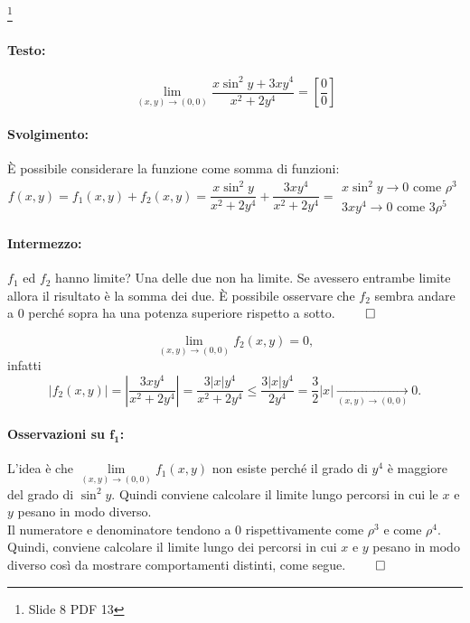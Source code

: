 \begin{example}\footnote{Slide 8 PDF 13}
	\paragraph{Testo:}
	\begin{equation*}
		\lim\limits_{(x,y)\rightarrow(0,0)} \frac{x\sin^2y+3xy^4}{x^2+2y^4}=\left[\frac{0}{0}\right]
	\end{equation*}
	\paragraph{Svolgimento:} È possibile considerare la funzione come somma di funzioni:
	\begin{equation*}
		f(x,y)=f_1(x,y)+f_2(x,y) = \frac{x\sin^2y}{x^2+2y^4} + \frac{3xy^4}{x^2+2y^4} = 
		\begin{matrix}
			x\sin^2y\rightarrow 0 \text{ come } \rho^3\\
			3xy^4\rightarrow 0 \text{ come } 3\rho^5
		\end{matrix}
	\end{equation*}
	
	\paragraph{Intermezzo:} $f_1$ ed $f_2$ hanno limite? Una delle due non ha limite. Se avessero entrambe limite allora il risultato è la somma dei due. È possibile osservare che $f_2$ sembra andare a 0 perché sopra ha una potenza superiore rispetto a sotto. $\qed$
	
	\begin{equation*}
		\lim\limits_{(x,y)\rightarrow(0,0)} f_2(x,y) = 0,
	\end{equation*}
	infatti
	\begin{equation*}
		|f_2(x,y)|=\left|\frac{3xy^4}{x^2+2y^4}\right| = \frac{3|x|y^4}{x^2+2y^4} \leq \frac{3|x|y^4}{2y^4}=\frac{3}{2}|x|\underset{(x,y)\rightarrow(0,0)}{\longrightarrow} 0.
	\end{equation*}
	
	\paragraph{Osservazioni su $\boldsymbol{f_1}$:} L'idea è che $	\lim\limits_{(x,y)\rightarrow(0,0)} f_1(x,y)$ non esiste perché il grado di $y^4$ è maggiore del grado di $\sin^2y$. Quindi conviene calcolare il limite lungo percorsi in cui le $x$ e $y$ pesano in modo diverso.\\
	Il numeratore e denominatore tendono a 0 rispettivamente come $\rho^3$ e come $\rho^4$. Quindi, conviene calcolare il limite lungo dei percorsi in cui $x$ e $y$ pesano in modo diverso così da mostrare comportamenti distinti, come segue. $\qed$
	

\end{example}
